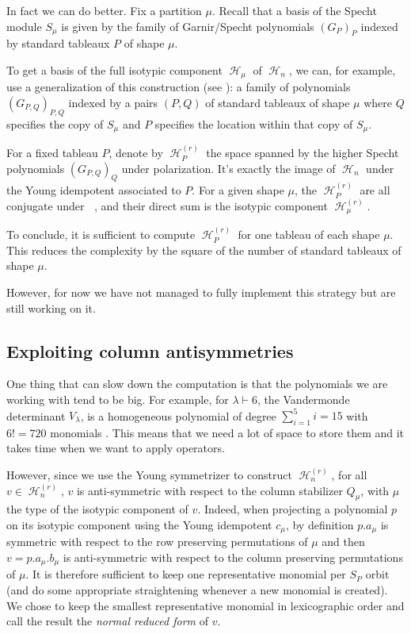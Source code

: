 \documentclass[letter,12pt]{article}
\newcommand{\pauline}[1]{\todo[linecolor=blue,backgroundcolor=cyan!25,bordercolor=blue]{#1}}
\newcommand{\Elambda}[1]{\mathcal{E}_{#1}}
\DeclareMathOperator{\Sn}{\mathbb{S}_n}
\DeclareMathOperator{\harmonics}{\mathcal{H}}
\begin{document}
	In fact we can do better. \pauline{Does it work only for $\harmonics_n^{(r)}$ or also for $\Elambda{\lambda}$?}
	Fix a partition $\mu$. Recall that a basis of the Specht module $S_\mu$  is given by the family of Garnir/Specht polynomials $(G_{P})_P$ indexed by standard tableaux $P$ of shape $\mu$.
	
	To get a basis of the full isotypic component $\harmonics_{\mu}$ of $\harmonics_n$, we can, for example, use a generalization of this construction (see \cite{Ariki1997}): a family of polynomials $(G_{P,Q})_{P,Q}$ indexed by a pairs $(P,Q)$ of standard tableaux of shape $\mu$ where $Q$ specifies the copy of $S_\mu$ and $P$ specifies the location within that copy of $S_\mu$.
	
	
	For a fixed tableau $P$, denote by $\harmonics_P^{(r)}$ the space spanned by the higher Specht polynomials $(G_{P,Q})_Q$ under polarization. It's exactly the image of $\harmonics_n$ under the Young idempotent associated to $P$. For a given shape $\mu$, the $\harmonics_P^{(r)}$ are all conjugate under $\Sn$, and their direct sum is the isotypic component $\harmonics_{\mu}^{(r)}$.
	
	To conclude, it is sufficient to compute $\harmonics_P^{(r)}$ for one tableau of each shape $\mu$. This reduces the complexity by the square of the number of standard tableaux of shape $\mu$.
	
	However, for now we have not managed to fully implement this strategy but are still working on it. 
	
	\subsection{Exploiting column antisymmetries}
	
	One thing that can slow down the computation is that the polynomials we are working with tend to be big. For example, for $\lambda \vdash 6$, the Vandermonde determinant $V_\lambda$, is a homogeneous polynomial of degree $\sum_{i=1}^{5}i = 15$ with $6!=720$ monomials . This means that we need a lot of space to store them and it takes time when we want to apply operators. 
	
	However, since we use the Young symmetrizer to construct $\harmonics_{n}^{(r)}$, for all $v \in \harmonics_{n}^{(r)}$, $v$ is anti-symmetric with respect to the column stabilizer $Q_\mu$, with $\mu$ the type of the isotypic component of $v$. Indeed, when projecting a polynomial $p$ on its isotypic component using the Young idempotent $c_\mu$, by definition $p.a_\mu$ is symmetric with respect to the row preserving permutations of $\mu$ and then $v = p.a_\mu.b_\mu$ is anti-symmetric with respect to the column preserving permutations of $\mu$. 
	It is therefore sufficient to keep one representative monomial per $S_P$ orbit \pauline{$S_P$ orbit?} (and do some appropriate straightening whenever a new monomial is created). We chose to keep the smallest representative monomial in lexicographic order and call the result the \emph{normal reduced form} of $v$. \\
	
\end{document}
